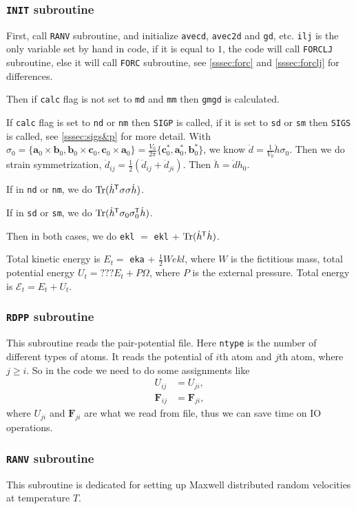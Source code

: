 \subsubsection{\texttt{INIT} subroutine}

First, call \texttt{RANV} subroutine, and initialize \texttt{avecd},
\texttt{avec2d} and \texttt{gd}, etc.
\texttt{ilj} is the only variable set by hand in code, if it is equal to $1$,
the code will call \texttt{FORCLJ} subroutine, else it will call \texttt{FORC}
subroutine, see \ref{sssec:forc} and \ref{sssec:forclj} for differences.

Then if \texttt{calc} flag is not set to \texttt{md} and \texttt{mm}
then \texttt{gmgd} is calculated.

If \texttt{calc} flag is set to \texttt{nd} or \texttt{nm}
then \texttt{SIGP} is called, if it is set to \texttt{sd} or
\texttt{sm} then \texttt{SIGS} is called, see \ref{sssec:sigs&p}
for more detail.
With
$\sigma_0 = 
\{
\bm{a}_0 \times \bm{b}_0, \bm{b}_0 \times \bm{c}_0,
\bm{c}_0 \times \bm{a}_0 
\}
= \frac{ V_0 }{ 2\pi } \{
\bm{c}^\ast_0, \bm{a}^\ast_0, \bm{b}^\ast_0
\}$,
we know
$\ddot{d} = \frac{ 1 }{ V_0 }\ddot{h} \sigma_0$.
Then we do strain symmetrization, $\ddot{d}_{ij} = \frac{ 1 }{ 2 }
(\ddot{d}_{ij} + \ddot{d}_{ji})$.
Then $\ddot{h} = \ddot{d} h_0$.

If in \texttt{nd} or \texttt{nm}, we do 
$\operatorname{Tr} (\dot{h}^{\mkern-1.5mu\mathsf{T}} \sigma \sigma \dot{h})$.

If in \texttt{sd} or \texttt{sm}, we do 
$\operatorname{Tr}(\dot{h}^{\mkern-1.5mu\mathsf{T}} \sigma_0 \sigma_0^{\mkern-1.5mu\mathsf{T}} \dot{ h })$.

Then in both cases, we do
\texttt{ekl} $=$ \texttt{ekl} + $\operatorname{Tr} (\dot{ h }^{\mkern-1.5mu\mathsf{T}} \dot{ h })$.

Total kinetic energy is $E_{t} = $ \texttt{eka} + $\frac{ 1 }{ 2 } W ekl$,
where $W$ is the fictitious mass,
total potential energy $U_{t} = ???E_{t} + P \Omega$, where $P$ is the external pressure.
Total energy is $\mathscr{E}_{t} = E_t + U_{t}$.


\subsubsection{\texttt{RDPP} subroutine}

This subroutine reads the pair-potential file.
Here \texttt{ntype} is the number of different types of atoms.
It reads the potential of $i$th atom and $j$th atom, where $j \geq i$.
So in the code we need to do some assignments like
\begin{align}
	U_{ij}      & = U_{ji},      \\
	\bm{F}_{ij} & = \bm{F}_{ji}, 
\end{align}
where $U_{ji}$ and $\bm{F}_{ji}$ are what we read from file,
thus we can save time on IO operations.


\subsubsection{\texttt{RANV} subroutine}

This subroutine is dedicated for setting up Maxwell distributed random velocities
at temperature $T$.


